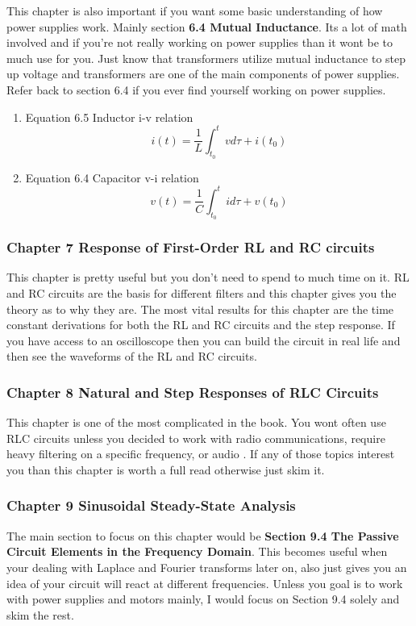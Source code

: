 \documentclass[11pt]{article}
\begin{document}
This chapter is also important if you want some basic understanding of how power supplies work.
Mainly section \textbf{6.4 Mutual Inductance}. Its a lot of math involved and if you're not really working
on power supplies than it wont be to much use for you. Just know that transformers utilize mutual
inductance to step up voltage and transformers are one of the main components of power supplies.
Refer back to section 6.4 if you ever find yourself working on power supplies.
\begin{enumerate}
\item Equation 6.5 Inductor i-v relation
\label{sec:orgf969707}
$$i(t) = \frac{1}{L}\int^{t}_{t_0}{vd\tau} + i(t_0)$$
\item Equation 6.4 Capacitor v-i relation
\label{sec:org7905d16}
$$v(t) = \frac{1}{C}\int^{t}_{t_0}{id\tau} + v(t_0)$$
\end{enumerate}
\subsubsection{Chapter 7 Response of First-Order RL and RC circuits}
\label{sec:org064488b}
This chapter is pretty useful but you don't need to spend to much time on it. RL and RC circuits are
the basis for different filters and this chapter gives you the theory as to why they are. The most
vital results for this chapter are the time constant derivations for both the RL and RC circuits and
the step response. If you have access to an oscilloscope then you can build the circuit in real life
and then see the waveforms of the RL and RC circuits.
\subsubsection{Chapter 8 Natural and Step Responses of RLC Circuits}
\label{sec:orgef6f204}
This chapter is one of the most complicated in the book. You wont often use RLC circuits unless you
decided to work with radio communications, require heavy filtering on a specific frequency, or audio
. If any of those topics interest you than this chapter is worth a full read otherwise just skim it.
\subsubsection{Chapter 9 Sinusoidal Steady-State Analysis}
\label{sec:orgf936d3c}
The main section to focus on this chapter would be \textbf{\textbf{Section 9.4 The Passive Circuit Elements in the
Frequency Domain}}. This becomes useful when your dealing with Laplace and Fourier transforms later
on, also just gives you an idea of your circuit will react at different frequencies. Unless you goal
is to work with power supplies and motors mainly, I would focus on Section 9.4 solely and skim the
rest.
\end{document}
